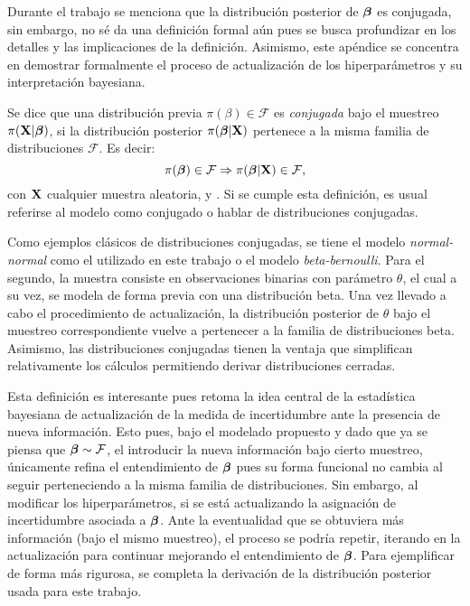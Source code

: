 \documentclass[../../Main/Main.tex]{subfiles}
\begin{document}
Durante el trabajo se menciona que la distribución posterior de $\bm{\beta}$ es conjugada, sin embargo, no sé da una definición formal aún pues se busca profundizar en los detalles y las implicaciones de la definición. Asimismo, este apéndice se concentra en demostrar formalmente el proceso de actualización de los hiperparámetros y su interpretación bayesiana. \\

\begin{definition}
Se dice que una distribución previa $\pi(\beta)\in\mathcal{F}$  es \emph{conjugada} bajo el muestreo $\pi(\mathbf{X}|\bm{\beta})$, si la distribución posterior $\pi(\bm{\beta}|\mathbf{X})$ pertenece a la misma familia de distribuciones $\mathcal{F}$. Es decir: $$\pi(\bm{\beta}) \in \mathcal{F} \Rightarrow \pi(\bm{\beta}|\mathbf{X}) \in \mathcal{F}, $$ con $\mathbf{X}$ cualquier muestra aleatoria, \citet{mendoza2011estadistica} y \cite{barber2010bayesian}. Si se cumple esta definición, es usual referirse al modelo como conjugado o hablar  de distribuciones conjugadas.
\end{definition}
Como ejemplos clásicos de distribuciones conjugadas, se tiene el modelo \textit{normal-normal} como el utilizado en este trabajo o el modelo \textit{beta-bernoulli}. Para el segundo, la muestra consiste en observaciones binarias con parámetro $\theta$, el cual a su vez, se modela de forma previa con una distribución beta. Una vez llevado a cabo el procedimiento de actualización, la distribución posterior de $\theta$ bajo el muestreo correspondiente vuelve a pertenecer a la familia de distribuciones beta. Asimismo, las distribuciones conjugadas tienen la ventaja que simplifican relativamente los cálculos permitiendo derivar distribuciones cerradas.

Esta definición es interesante pues retoma la idea central de la estadística bayesiana de actualización de la medida de incertidumbre ante la presencia de nueva información. Esto pues, bajo el modelado propuesto y dado que ya se piensa que $\bm{\beta}\sim\mathcal{F}$, el introducir la nueva información bajo cierto muestreo, únicamente refina el entendimiento de $\bm{\beta}$ pues su forma funcional no cambia al seguir perteneciendo a la misma familia de distribuciones. Sin embargo, al modificar los hiperparámetros, si se está actualizando la asignación de incertidumbre asociada a $\bm{\beta}$.  Ante la eventualidad que se obtuviera más información (bajo el mismo muestreo), el proceso se podría repetir, iterando en la actualización para continuar mejorando el entendimiento de $\bm{\beta}$. Para ejemplificar de forma más rigurosa, se completa la derivación de la distribución posterior usada para este trabajo.\\
\end{document}
